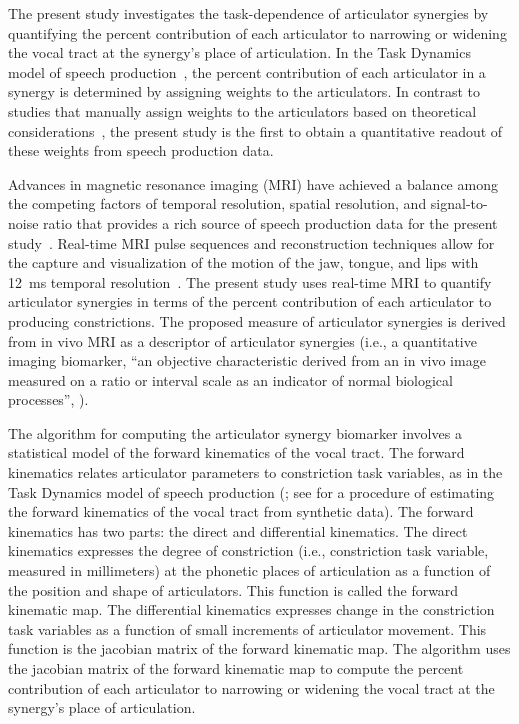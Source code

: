 \documentclass[preprint]{JASAnew}\usepackage[]{graphicx}\usepackage[]{color}
\begin{document}
The present study investigates the task-dependence of articulator synergies by quantifying the percent contribution of each articulator to narrowing or widening the vocal tract at the synergy's place of articulation. 
%
In the Task Dynamics model of speech production~\citep{saltzman1989dynamical}, the percent contribution of each articulator in a synergy is determined by assigning weights to the articulators. 
%
In contrast to studies that manually assign weights to the articulators based on theoretical considerations~\citep[for example, see][for an assignment of weights based on articulator mass]{simko2010embodied}, the present study is the first to obtain a quantitative readout of these weights from speech production data. 

Advances in magnetic resonance imaging (MRI) have achieved a balance among the competing factors of temporal resolution, spatial resolution, and signal-to-noise ratio that provides a rich source of speech production data for the present study~\citep{scott2014speech}. Real-time MRI pulse sequences and reconstruction techniques allow for the capture and visualization of the motion of the jaw, tongue, and lips with \SI{12}{\milli\second} temporal resolution~\citep{toutios2016advances,lingala2017fast}. 
%
The present study uses real-time MRI to quantify articulator synergies in terms of the percent contribution of each articulator to producing constrictions.
%
The proposed measure of articulator synergies is derived from in vivo MRI as a descriptor of articulator synergies (i.e., a quantitative imaging biomarker, ``an objective characteristic derived from an in vivo image measured on a ratio or interval scale as an indicator of normal biological processes'', \citealt{kessler2015emerging,sullivan2015metrology}). 





The algorithm for computing the articulator synergy biomarker involves a statistical model of the forward kinematics of the vocal tract. The forward kinematics relates articulator parameters to constriction task variables, as in the Task Dynamics model of speech production (\citealt{saltzman1989dynamical}; see \citealt{lammert2013statistical} for a procedure of estimating the forward kinematics of the vocal tract from synthetic data). 
%
The forward kinematics has two parts: the direct and differential kinematics.
%
The direct kinematics expresses the degree of constriction (i.e., constriction task variable, measured in millimeters) at the phonetic places of articulation as a function of the position and shape of articulators. 
%
This function is called the forward kinematic map. 
%
The differential kinematics expresses change in the constriction task variables as a function of small increments of articulator movement.
%
This function is the jacobian matrix of the forward kinematic map. 
%
The algorithm uses the jacobian matrix of the forward kinematic map to compute the percent contribution of each articulator to narrowing or widening the vocal tract at the synergy's place of articulation. 
\end{document}
